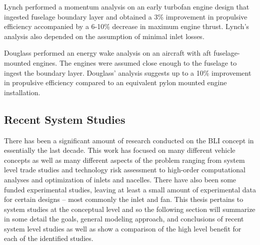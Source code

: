 			Lynch \cite{Lynch1960} performed a momentum analysis on an early turbofan engine design that ingested fuselage boundary layer and obtained a 3\% improvement in propulsive efficiency accompanied by a 6-10\% decrease in maximum engine thrust. Lynch’s analysis also depended on the assumption of minimal inlet losses.
			
			Douglass \cite{Douglass1970} performed an energy wake analysis on an aircraft with aft fuselage-mounted engines. The engines were assumed close enough to the fuselage to ingest the boundary layer. Douglass’ analysis suggests up to a 10\% improvement in propulsive efficiency compared to an equivalent pylon mounted engine installation. 

		\subsection{Recent System Studies}
			There has been a significant amount of research conducted on the BLI concept in essentially the last decade.  This work has focused on many different vehicle concepts as well as many different aspects of the problem ranging from system level trade studies and technology risk assessment to high-order computational analyses and optimization of inlets and nacelles.  There have also been some funded experimental studies, leaving at least a small amount of experimental data for certain designs -- most commonly the inlet and fan.  This thesis pertains to system studies at the conceptual level and so the following section will summarize in some detail the goals, general modeling approach, and conclusions of recent system level studies as well as show a comparison of the high level benefit for each of the identified studies.  

